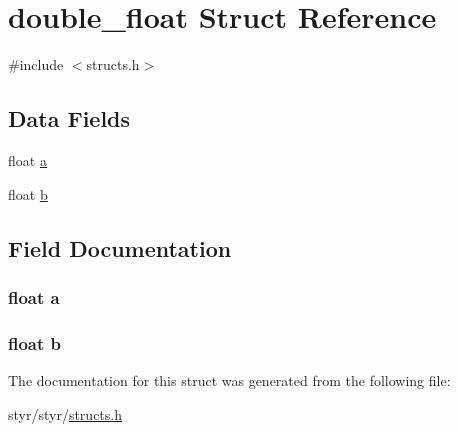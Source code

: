 \hypertarget{structdouble__float}{}\section{double\+\_\+float Struct Reference}
\label{structdouble__float}


{\ttfamily \#include $<$structs.\+h$>$}

\subsection*{Data Fields}
\begin{DoxyCompactItemize}
\item 
float \hyperlink{structdouble__float_a4aec1a5be9d9a4a394a2e49e9744286e}{a}
\item 
float \hyperlink{structdouble__float_a83fc1af92e29717b4513d121b0c72c7d}{b}
\end{DoxyCompactItemize}


\subsection{Field Documentation}
\subsubsection[{\texorpdfstring{a}{a}}]{\setlength{\rightskip}{0pt plus 5cm}float a}\hypertarget{structdouble__float_a4aec1a5be9d9a4a394a2e49e9744286e}{}\label{structdouble__float_a4aec1a5be9d9a4a394a2e49e9744286e}
\subsubsection[{\texorpdfstring{b}{b}}]{\setlength{\rightskip}{0pt plus 5cm}float b}\hypertarget{structdouble__float_a83fc1af92e29717b4513d121b0c72c7d}{}\label{structdouble__float_a83fc1af92e29717b4513d121b0c72c7d}


The documentation for this struct was generated from the following file\+:\begin{DoxyCompactItemize}
\item 
styr/styr/\hyperlink{structs_8h}{structs.\+h}\end{DoxyCompactItemize}
